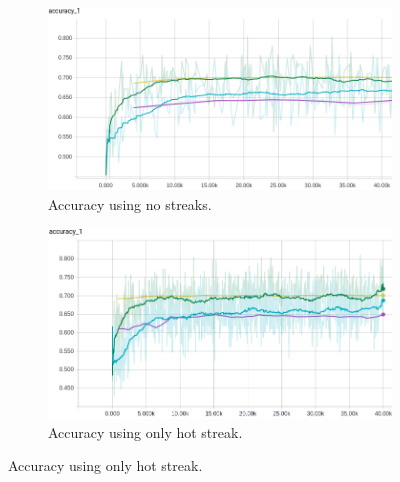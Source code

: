 \documentclass{article} %
\begin{document}
\begin{figure}[!htb]
  \begin{subfigure}{0.5\textwidth}
    \includegraphics[width=\linewidth]{plots/model1/symmetrical/streak-/accuracy.png}
    \caption{Accuracy using no streaks.}\label{fig:symmetrical--accuracy}
  \end{subfigure}
  \begin{subfigure}{0.5\textwidth}
    \includegraphics[width=\linewidth]{plots/model1/symmetrical/streak-h/accuracy.png}
    \caption{Accuracy using only hot streak.}\label{fig:symmetrical-h-accuracy}
  \end{subfigure}



\end{figure}
\end{document}

